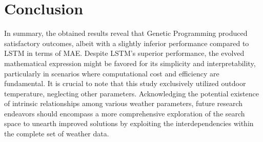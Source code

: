 \section{Conclusion}
In summary, the obtained results reveal that Genetic Programming produced satisfactory outcomes, albeit with a slightly inferior performance compared to LSTM in terms of MAE. Despite LSTM's superior performance, the evolved mathematical expression might be favored for its simplicity and interpretability, particularly in scenarios where computational cost and efficiency are fundamental. It is crucial to note that this study exclusively utilized outdoor temperature, neglecting other parameters. Acknowledging the potential existence of intrinsic relationships among various weather parameters, future research endeavors should encompass a more comprehensive exploration of the search space to unearth improved solutions by exploiting the interdependencies within the complete set of weather data.